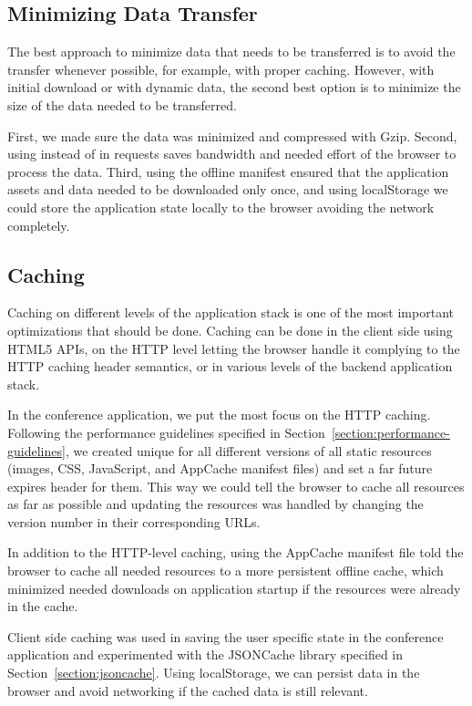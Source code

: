 \subsection{Minimizing Data Transfer}

The best approach to minimize data that needs to be transferred is to
avoid the transfer whenever possible, for example, with proper
caching. However, with initial download or with dynamic data, the
second best option is to minimize the size of the data needed to be
transferred.

First, we made sure the data was minimized and compressed with
Gzip. Second, using  instead of  in 
requests saves bandwidth and needed effort of the browser to process
the data. Third, using the offline manifest ensured that the
application assets and data needed to be downloaded only once, and
using localStorage we could store the application state locally to the
browser avoiding the network completely.

\subsection{Caching}

Caching on different levels of the application stack is one of the
most important optimizations that should be done. Caching can be done
in the client side using HTML5 APIs, on the HTTP level letting the
browser handle it complying to the HTTP caching header semantics, or
in various levels of the backend application stack.

In the conference application, we put the most focus on the HTTP
caching. Following the performance guidelines specified in
Section~\ref{section:performance-guidelines}, we created unique
 for all different versions of all static resources
(images, CSS, JavaScript, and AppCache manifest files) and set a far
future expires header for them. This way we could tell the browser to
cache all resources as far as possible and updating the resources was
handled by changing the version number in their corresponding URLs.

In addition to the HTTP-level caching, using the AppCache manifest
file told the browser to cache all needed resources to a more
persistent offline cache, which minimized needed downloads on
application startup if the resources were already in the cache.

Client side caching was used in saving the user specific state in the
conference application and experimented with the JSONCache library
specified in Section~\ref{section:jsoncache}. Using localStorage, we
can persist data in the browser and avoid networking if the cached
data is still relevant.

